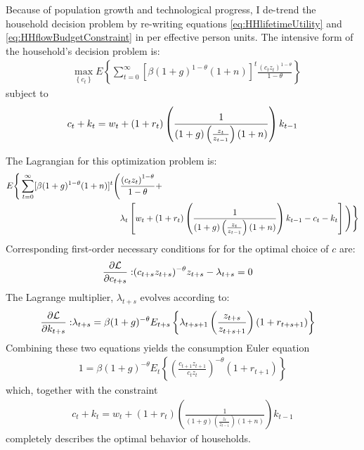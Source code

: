 \documentclass[11pt]{article}
\begin{document}
Because of population growth and technological progress, I de-trend the household decision problem by re-writing equations \ref{eq:HHlifetimeUtility} and \ref{eq:HHflowBudgetConstraint} in per effective person units.  The intensive form of the household's decision problem is:
        \begin{align}\label{eq:intensive-HH-utility}
		&\max_{\left\{c_t\right\}} E\left\{\sum_{t=0}^{\infty} [\beta(1+g)^{1-\theta}(1+n)]^t \frac{\left(c_t z_t\right)^{1-\theta}}{1-\theta} \right\}
	\end{align}
subject to 
	\begin{align}
		c_t + k_t= w_t + (1 + r_t)\left(\frac{1}{(1 + g)\left(\frac{z_t}{z_{t-1}}\right)(1 + n)}\right)k_{t-1}\notag
	\end{align}
	
The Lagrangian for this optimization problem is:
	\begin{align}
		E\Bigg\{\sum_{t=0}^{\infty} [\beta(1+g)^{1-\theta}(1+n)]^t\Bigg(&\frac{\left(c_t z_t\right)^{1-\theta}}{1-\theta} + \notag \\
		&\lambda_{t} \left[w_t + (1 + r_t)\left(\frac{1}{(1 + g)\left(\frac{z_t}{z_{t-1}}\right)(1 + n)}\right)k_{t-1} - c_t - k_t\right]\Bigg)\Bigg\} \notag
	\end{align}
Corresponding first-order necessary conditions for for the optimal choice of $c$ are:
	\begin{align}
		\frac{\partial \mathcal{L}}{\partial c_{t+s}}:& (c_{t+s}z_{t+s})^{-\theta}z_{t+s} - \lambda_{t+s} = 0 \notag 
	\end{align}
The Lagrange multiplier, $\lambda_{t+s}$ evolves according to:
	\begin{align}
		\frac{\partial \mathcal{L}}{\partial k_{t+s}}:& \lambda_{t+s} = \beta(1+g)^{-\theta} E_{t+s}\left\{\lambda_{t+s+1}\left(\frac{z_{t+s}}{z_{t+s+1}}\right)(1 + r_{t+s+1})\right\} \notag
	\end{align}
Combining these two equations yields the consumption Euler equation
	\begin{align}\label{eq:inelastic-euler}
		1= \beta(1+g)^{-\theta} E_{t}\left\{\left(\frac{c_{t+1}z_{t+1}}{c_t z_t}\right)^{-\theta}(1 + r_{t+1})\right\}
	\end{align}
which, together with the constraint
	\begin{align}\label{eq:inelastic-HH-constraint}
		c_t + k_t = w_t + (1 + r_t)\left(\frac{1}{(1 + g)\left(\frac{z_t}{z_{t-1}}\right)(1 + n)}\right)k_{t-1}
	\end{align}
completely describes the optimal behavior of households.
\end{document}
